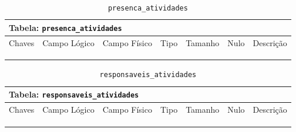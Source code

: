 \documentclass[12pt,a4paper]{article}
\begin{document}
\begin{center}
\begin{table}[h!]
	\caption{\texttt{presenca\_atividades}}
	\label{tabela:presencaAtividades}
	\begin{tabular}{|p{1cm}|p{1.5cm}|p{1.25cm}|p{1.25cm}|p{1.75cm}|p{1.25cm}|p{4.5cm}|}\hline	
		\multicolumn{7}{|p{16cm}|}{\cellcolor{cinzaClaro}  \centering Tabela: \texttt{presenca\_atividades}} \\ \hline %
		{\small Chaves} & {\small Campo Lógico} & {\small Campo Físico} & {\small Tipo} & {\small Tamanho} & {\small Nulo} & {\small Descrição}\\\hline %
		
		{\tiny } & {\tiny } & {\tiny } & {\tiny } & {\tiny } & {\tiny } &{\tiny }\\\hline
		{\tiny } & {\tiny } & {\tiny } & {\tiny } & {\tiny } & {\tiny } &{\tiny }\\\hline
		{\tiny } & {\tiny } & {\tiny } & {\tiny } & {\tiny } & {\tiny } &{\tiny }\\\hline
		
			
	\end{tabular}
\end{table}	
\end{center}


\begin{center}
\begin{table}[h!]
	\caption{\texttt{responsaveis\_atividades}}
	\label{tabela:responsaveisAtividades}
	\begin{tabular}{|p{1cm}|p{1.5cm}|p{1.25cm}|p{1.25cm}|p{1.75cm}|p{1.25cm}|p{4.5cm}|}\hline	
		\multicolumn{7}{|p{16cm}|}{\cellcolor{cinzaClaro}  \centering Tabela: \texttt{responsaveis\_atividades}} \\ \hline %
		{\small Chaves} & {\small Campo Lógico} & {\small Campo Físico} & {\small Tipo} & {\small Tamanho} & {\small Nulo} & {\small Descrição}\\\hline %
		
		{\tiny } & {\tiny } & {\tiny } & {\tiny } & {\tiny } & {\tiny } &{\tiny }\\\hline
		{\tiny } & {\tiny } & {\tiny } & {\tiny } & {\tiny } & {\tiny } &{\tiny }\\\hline
		{\tiny } & {\tiny } & {\tiny } & {\tiny } & {\tiny } & {\tiny } &{\tiny }\\\hline
		
			
	\end{tabular}
\end{table}	
\end{center}
\end{document}
